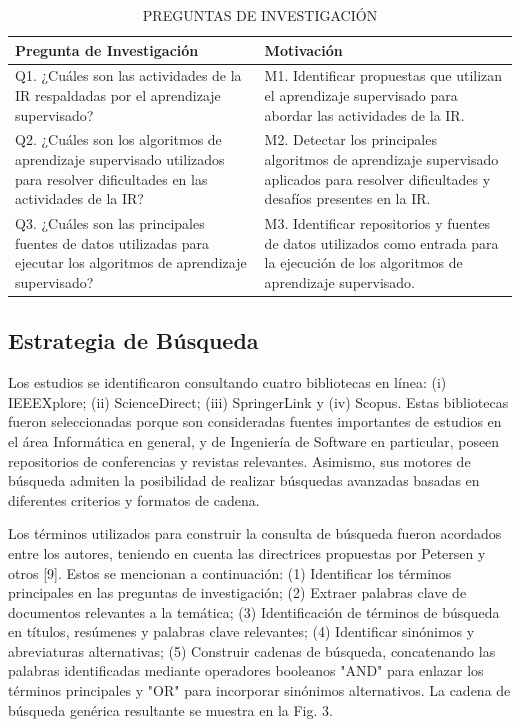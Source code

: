 \documentclass[journal]{IEEEtran}
\begin{document}
\begin{table}[!t]
\renewcommand{\arraystretch}{1.3}
\caption{PREGUNTAS DE INVESTIGACIÓN}
\label{tabla1}
\centering
\begin{tabular}{p{3cm}p{4.5cm}}
\hline
\hline
Pregunta de Investigación & Motivación \\
\hline
Q1. ¿Cuáles son las actividades de la IR respaldadas por el 
aprendizaje supervisado?  & M1. Identificar propuestas que 
utilizan el aprendizaje supervisado para abordar las 
actividades de la IR.\\ \cline{1-2}
Q2. ¿Cuáles son los algoritmos de aprendizaje supervisado utilizados para resolver dificultades en las actividades de la IR? & M2. Detectar los principales algoritmos de aprendizaje supervisado aplicados para resolver dificultades y desafíos presentes en la IR. \\ \cline{1-2}
Q3. ¿Cuáles son las principales fuentes de datos utilizadas para ejecutar los algoritmos de aprendizaje supervisado? & M3. Identificar repositorios y fuentes de datos utilizados como entrada para la ejecución de los algoritmos de aprendizaje supervisado. \\
\hline \hline                                                                                                    
\end{tabular}
\end{table}



\subsection{Estrategia de Búsqueda}

Los estudios se identificaron consultando cuatro bibliotecas en línea: (i) IEEEXplore; (ii) ScienceDirect; (iii) SpringerLink y (iv) Scopus. Estas bibliotecas fueron seleccionadas porque son consideradas fuentes importantes de estudios en el área Informática en general, y de Ingeniería de Software en particular, poseen repositorios de conferencias y revistas relevantes. Asimismo, sus motores de búsqueda admiten la posibilidad de realizar búsquedas avanzadas basadas en diferentes criterios y formatos de cadena.

Los términos utilizados para construir la consulta de búsqueda fueron acordados entre los autores, teniendo en cuenta las directrices propuestas por Petersen y otros \cite{petersen2008systematic}[9]. Estos se mencionan a continuación: (1) Identificar los términos principales en las preguntas de investigación; (2) Extraer palabras clave de documentos relevantes a la temática; (3) Identificación de términos de búsqueda en títulos, resúmenes y palabras clave relevantes; (4) Identificar sinónimos y abreviaturas alternativas; (5) Construir cadenas de búsqueda, concatenando las palabras identificadas mediante operadores booleanos "AND" para enlazar los términos principales y "OR" para incorporar sinónimos alternativos. La cadena de búsqueda genérica resultante se muestra en la Fig. 3.
\end{document}
